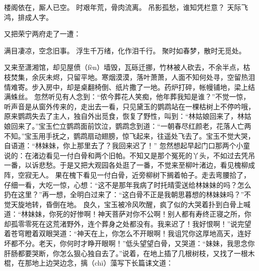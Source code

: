 \documentclass[12pt,oneside]{book}
\begin{document}
楼阁依在，厮人已空。
时艰年荒，骨肉流离。
吊影孤愁，谁知凭栏意？
天际飞鸿，排成人字。

又把荣宁两府走了一遭：

满目凄凉，空念旧事。
浮生千万绪，化作泪千行。
聚时如春梦，散时无觅处。

又来至潇湘馆，却见屋偾（fèn）墙毁，瓦砾迁挪，竹林被人砍去，不余半点，枯枝焚集，余灰未烬，只留平地。寒烟漠漠，落叶萧萧，人面不知何处寻，空留热泪情难寄。步入房中，却是桌翻椅倒、纸片撒了一地。药炉打碎，帐幔铺地，梁上结满蛛丝。
忽然听见有人念到：“侬今葬花人笑痴，他年葬我知是谁？”不觉一惊，听声音是从窗外传来的，走出去一看，只见黛玉的鹦鹉站在一棵枯树上不停吟哦，原来鹦鹉失去了主人，独自外出觅食，恢复了野性，叫到：“林姑娘回来了，林姑娘回来了。”宝玉伫立鹦鹉面前饮泣，鹦鹉念到道：“一朝春尽红颜老，花落人亡两不知。”宝玉用手抚之，鹦鹉扇动翅膀，惊飞起来，往遥处飞去了。宝玉不觉大哭，自语道：“林妹妹，你上那里去了？我回来迟了！”
忽然想起早起门口那两个小童说的：在渚边看见一付白骨和两个旧帕。不知又是那个冤死的丫头，不如过去凭吊一番，以诉悲愁。于是又把大观园各处逛了一番，不觉来至柳叶渚边，看见槐柳成阵，空寂无人。
果在槐下看见一付白骨，近旁柳树下搁着帕子。走去弯腰拾了，仔细一看，大吃一惊，心想：“这不是那年我病了时托晴雯送给林妹妹的吗？怎么扔在这里？”再一想，全明白过来了：“这白骨不正是我朝思暮想的林妹妹吗？”不觉天旋地转，昏倒在地。
良久，宝玉被冷风吹醒，疯了似的大哭着扑到白骨上喊道：“林妹妹，你死的好惨啊！神天菩萨对你不公啊！别人都有寿终正寝之所，你却孤零零死在这荒渚野外，连个葬身之处都没有。我来迟了！我好恨啊！”说完望着苍穹瞪着双眼哭道：“神天在上，你怎么不开眼啊！我诅咒你这厚地高天，连好坏都不分。老天，你何时才睁开眼啊！”低头望望白骨，又哭道：“妹妹，我思念你肝肠都要哭断，你怎么狠心独自去了。”说着，在地上插了几根树枝，又找了一根木棍，在那地上边哭边念，摛（chī）藻写下长篇诔文道：
\end{document}

